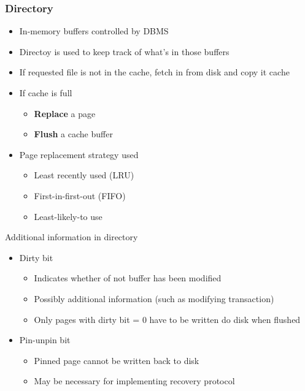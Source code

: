 \subsubsection{Directory}
\begin{itemize}
	\item In-memory buffers controlled by DBMS
	\item Directoy is used to keep track of what's in those buffers
	\item If requested file is not in the cache, fetch in from disk and copy it cache
	\item If cache is full
	\begin{itemize}
		\item \textbf{Replace} a page
		\item \textbf{Flush} a cache buffer
	\end{itemize}
	\item Page replacement strategy used
	\begin{itemize}
		\item Least recently used (LRU)
		\item First-in-first-out (FIFO)
		\item Least-likely-to use
	\end{itemize}
\end{itemize}
Additional information in directory
\begin{itemize}
	\item Dirty bit
	\begin{itemize}
		\item Indicates whether of not buffer has been modified
		\item Possibly additional information (such as modifying transaction)
		\item Only pages with dirty bit = 0 have to be written do disk when flushed
	\end{itemize}
	\item Pin-unpin bit
	\begin{itemize}
		\item Pinned page cannot be written back to disk
		\item May be necessary for implementing recovery protocol
	\end{itemize}
\end{itemize}
